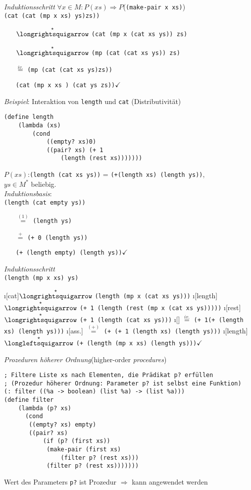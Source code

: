 \emph{Induktionsschritt} $\forall x \in M: P(xs) \Rightarrow P$(\lstinline|(make-pair x xs)|)\\
\lstinline|(cat (cat (mp x xs) ys)zs))|
\begin{enumerate}
\item[$\overset{\star}{\text{\eval}}$] \lstinline|(cat (mp x (cat xs ys)) zs)|
\item[$\overset{\star}{\text{\eval}}$]
\lstinline|(mp (cat (cat xs ys)) zs)|
\item[$\overset{iv.}{=}$] \lstinline|(mp (cat (cat xs ys)zs))|
\item[\reval] \lstinline|(cat (mp x xs ) (cat ys zs))|$\checkmark$
\end{enumerate}
\bigskip
\emph{Beispiel}: Interaktion von \lstinline|length| und \lstinline|cat| (Distributivität)
\begin{lstlisting}
(define length
	(lambda (xs)
		(cond
			((empty? xs)0)
			((pair? xs) (+ 1 
				(length (rest xs)))))))
\end{lstlisting}
$P(xs)$:\lstinline|(length (cat xs ys))| = \lstinline|(+(length xs) (length ys))|,\\
 $ys \in M^*$ beliebig.\\
\emph{Induktionsbasis}:\\
\lstinline|(length (cat empty ys))|
\begin{enumerate}
	\item[$\overset{(1)}{=}$] \lstinline|(length ys)|
	\item[$\overset{+}{=}$] \lstinline|(+ 0 (length ys))|
	\item[\reval] \lstinline|(+ (length empty) (length ys))|$\checkmark$
\end{enumerate}
\emph{Induktionsschritt}\\
\lstinline|(length (mp x xs) ys)|
\begin{enumerate}
	\i[cat]$\overset{\star}{\text{\eval}}$ \lstinline|(length (mp x (cat xs ys)))|
	\i[length]$\overset{\star}{\text{\eval}}$ \lstinline|(+ 1 (length (rest (mp x (cat xs ys)))))|
	\i[rest]$\overset{\star}{\text{\eval}}$ \lstinline|(+ 1 (length (cat xs ys)))|
	\i[] $\overset{iv.}{=}$ \lstinline|(+ 1(+ (length xs) (length ys)))|
	\i[ass.] $\overset{(+)}{=}$ \lstinline|(+ (+ 1 (length xs) (length ys)))|
	\i[length]$\overset{\star}{\text{\reval}}$ \lstinline|(+ (length (mp x xs) (length ys)))|$\checkmark$
\end{enumerate}
\newpage
\emph{Prozeduren höherer Ordnung}\hfill(higher-order \emph{procedures})
\begin{lstlisting}
; Filtere Liste xs nach Elementen, die Prädikat p? erfüllen
; (Prozedur höherer Ordnung: Parameter p? ist selbst eine Funktion)
(: filter ((%a -> boolean) (list %a) -> (list %a)))
(define filter
	(lambda (p? xs)
	  (cond 
	   ((empty? xs) empty)
	   ((pair? xs)  
		   (if (p? (first xs))
			(make-pair (first xs)
				(filter p? (rest xs)))  
			(filter p? (rest xs)))))))
\end{lstlisting}
Wert des Parameters \lstinline|p?| ist Prozedur $\Rightarrow$ kann angewendet werden